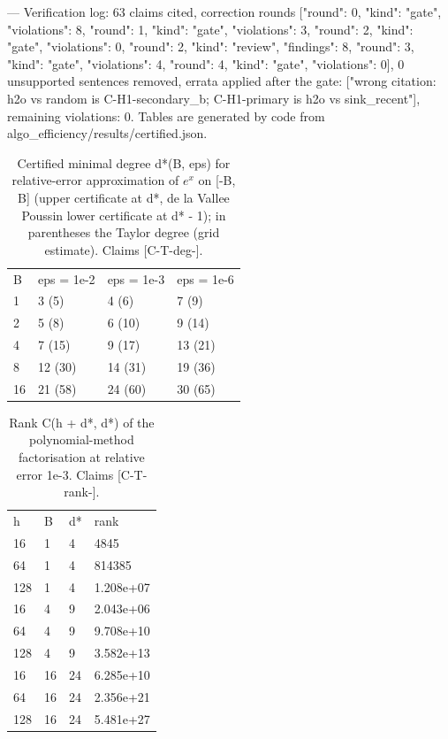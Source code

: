 \documentclass[10pt,twocolumn]{article}
\begin{document}
---
Verification log: 63 claims cited, correction rounds [{"round": 0, "kind": "gate", "violations": 8}, {"round": 1, "kind": "gate", "violations": 3}, {"round": 2, "kind": "gate", "violations": 0}, {"round": 2, "kind": "review", "findings": 8}, {"round": 3, "kind": "gate", "violations": 4}, {"round": 4, "kind": "gate", "violations": 0}], 0 unsupported sentences removed, errata applied after the gate: ["wrong citation: h2o vs random is C-H1-secondary\_b; C-H1-primary is h2o vs sink\_recent"], remaining violations: 0. Tables are generated by code from algo\_efficiency/results/certified.json.
\begin{table}[t]\centering\small\caption{Certified minimal degree d*(B, eps) for relative-error approximation of $e^x$ on [-B, B] (upper certificate at d*, de la Vallee Poussin lower certificate at d* - 1); in parentheses the Taylor degree (grid estimate). Claims [C-T-deg-\textasteriskcentered].}
\begin{tabular}{llll}\hline
B & eps = 1e-2 & eps = 1e-3 & eps = 1e-6 \\
1 & 3 (5) & 4 (6) & 7 (9) \\
2 & 5 (8) & 6 (10) & 9 (14) \\
4 & 7 (15) & 9 (17) & 13 (21) \\
8 & 12 (30) & 14 (31) & 19 (36) \\
16 & 21 (58) & 24 (60) & 30 (65) \\\hline
\end{tabular}\end{table}
\begin{table}[t]\centering\small\caption{Rank C(h + d*, d*) of the polynomial-method factorisation at relative error 1e-3. Claims [C-T-rank-\textasteriskcentered].}
\begin{tabular}{llll}\hline
h & B & d* & rank \\
16 & 1 & 4 & 4845 \\
64 & 1 & 4 & 814385 \\
128 & 1 & 4 & 1.208e+07 \\
16 & 4 & 9 & 2.043e+06 \\
64 & 4 & 9 & 9.708e+10 \\
128 & 4 & 9 & 3.582e+13 \\
16 & 16 & 24 & 6.285e+10 \\
64 & 16 & 24 & 2.356e+21 \\
128 & 16 & 24 & 5.481e+27 \\\hline
\end{tabular}\end{table}
\end{document}
